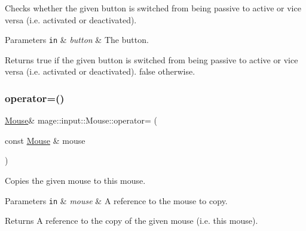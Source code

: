 Checks whether the given button is switched from being passive to active or vice versa (i.\+e. activated or deactivated).


\begin{DoxyParams}[1]{Parameters}
\mbox{\tt in}  & {\em button} & The button. \\
\hline
\end{DoxyParams}
\begin{DoxyReturn}{Returns}
{\ttfamily true} if the given button is switched from being passive to active or vice versa (i.\+e. activated or deactivated). {\ttfamily false} otherwise. 
\end{DoxyReturn}
\mbox{\label{classmage_1_1input_1_1_mouse_af4ce64a7808af28c80bc9c01c83f7d14}} 
\subsubsection{\texorpdfstring{operator=()}{operator=()}\hspace{0.1cm}{\footnotesize\ttfamily [1/2]}}
{\footnotesize\ttfamily \mbox{\hyperlink{classmage_1_1input_1_1_mouse}{Mouse}}\& mage\+::input\+::\+Mouse\+::operator= (\begin{DoxyParamCaption}\item[{const \mbox{\hyperlink{classmage_1_1input_1_1_mouse}{Mouse}} \&}]{mouse }\end{DoxyParamCaption})\hspace{0.3cm}{\ttfamily [delete]}}

Copies the given mouse to this mouse.


\begin{DoxyParams}[1]{Parameters}
\mbox{\tt in}  & {\em mouse} & A reference to the mouse to copy. \\
\hline
\end{DoxyParams}
\begin{DoxyReturn}{Returns}
A reference to the copy of the given mouse (i.\+e. this mouse). 
\end{DoxyReturn}
\mbox{\label{classmage_1_1input_1_1_mouse_a05d2471a4f517cc1970df352e7a68724}} 
